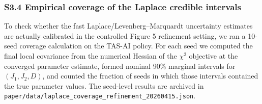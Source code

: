 \documentclass[
]{article}
\begin{document}
\hypertarget{s3.4-empirical-coverage-of-the-laplace-credible-intervals}{%
\subsubsection{S3.4 Empirical coverage of the Laplace credible
intervals}\label{s3.4-empirical-coverage-of-the-laplace-credible-intervals}}

To check whether the fast Laplace/Levenberg--Marquardt uncertainty
estimates are actually calibrated in the controlled Figure 5 refinement
setting, we ran a 10-seed coverage calculation on the TAS-AI policy. For
each seed we computed the final local covariance from the numerical
Hessian of the \(\chi^2\) objective at the converged parameter estimate,
formed nominal 90\% marginal intervals for \((J_1,J_2,D)\), and counted
the fraction of seeds in which those intervals contained the true
parameter values. The seed-level results are archived in
\texttt{paper/data/laplace\_coverage\_refinement\_20260415.json}.
\end{document}
